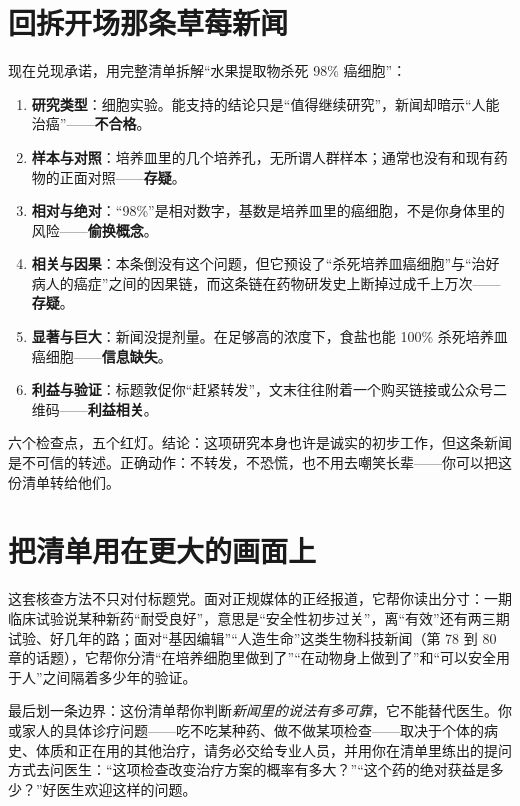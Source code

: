 \section{回拆开场那条草莓新闻}

现在兑现承诺，用完整清单拆解“水果提取物杀死 98\% 癌细胞”：

\begin{enumerate}[itemsep=2pt]
\item \textbf{研究类型}：细胞实验。能支持的结论只是“值得继续研究”，新闻却暗示“人能治癌”——\textbf{不合格}。
\item \textbf{样本与对照}：培养皿里的几个培养孔，无所谓人群样本；通常也没有和现有药物的正面对照——\textbf{存疑}。
\item \textbf{相对与绝对}：“98\%”是相对数字，基数是培养皿里的癌细胞，不是你身体里的风险——\textbf{偷换概念}。
\item \textbf{相关与因果}：本条倒没有这个问题，但它预设了“杀死培养皿癌细胞”与“治好病人的癌症”之间的因果链，而这条链在药物研发史上断掉过成千上万次——\textbf{存疑}。
\item \textbf{显著与巨大}：新闻没提剂量。在足够高的浓度下，食盐也能 100\% 杀死培养皿癌细胞——\textbf{信息缺失}。
\item \textbf{利益与验证}：标题敦促你“赶紧转发”，文末往往附着一个购买链接或公众号二维码——\textbf{利益相关}。
\end{enumerate}

六个检查点，五个红灯。结论：这项研究本身也许是诚实的初步工作，但这条新闻是不可信的转述。正确动作：不转发，不恐慌，也不用去嘲笑长辈——你可以把这份清单转给他们。

\section{把清单用在更大的画面上}

这套核查方法不只对付标题党。面对正规媒体的正经报道，它帮你读出分寸：一期临床试验说某种新药“耐受良好”，意思是“安全性初步过关”，离“有效”还有两三期试验、好几年的路；面对“基因编辑”“人造生命”这类生物科技新闻（第 78 到 80 章的话题），它帮你分清“在培养细胞里做到了”“在动物身上做到了”和“可以安全用于人”之间隔着多少年的验证。

最后划一条边界：这份清单帮你判断\emph{新闻里的说法有多可靠}，它不能替代医生。你或家人的具体诊疗问题——吃不吃某种药、做不做某项检查——取决于个体的病史、体质和正在用的其他治疗，请务必交给专业人员，并用你在清单里练出的提问方式去问医生：“这项检查改变治疗方案的概率有多大？”“这个药的绝对获益是多少？”好医生欢迎这样的问题。

